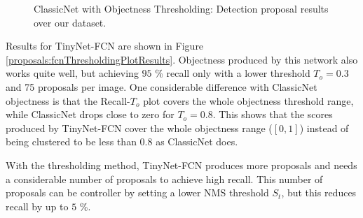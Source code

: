 \begin{figure}[t]
{
	}
	\vspace*{0.5cm}
	\caption{ClassicNet with Objectness Thresholding: Detection proposal results over our dataset.}
	\label{proposals:cnnThresholdingPlotResults}
	\vspace*{0.5cm}
\end{figure}

Results for TinyNet-FCN are shown in Figure \ref{proposals:fcnThresholdingPlotResults}. Objectness produced by this network also works quite well, but achieving $95$ \% recall only with a lower threshold $T_o = 0.3$ and 75 proposals per image. One considerable difference with ClassicNet objectness is that the Recall-$T_o$ plot covers the whole objectness threshold range, while ClassicNet drops close to zero for $T_o = 0.8$. This shows that the scores produced by TinyNet-FCN cover the whole objectness range ($[0, 1]$) instead of being clustered to be less than $0.8$ as ClassicNet does.

With the thresholding method, TinyNet-FCN produces more proposals and needs a considerable number of proposals to achieve high recall. This number of proposals can be controller by setting a lower NMS threshold $S_t$, but this reduces recall by up to $5$ \%.


